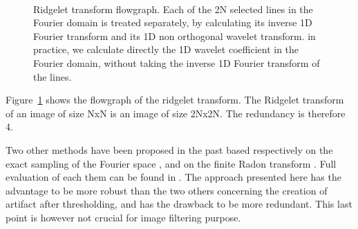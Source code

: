 \documentclass{article}
\begin{document}
\begin{figure}[htb]
\centerline{
\hbox{
}}
\caption{Ridgelet transform flowgraph. Each of the 2N selected lines 
in the Fourier domain is treated separately, by calculating its
inverse 1D Fourier transform and its 1D non orthogonal wavelet transform.
in practice, we calculate directly the 1D wavelet coefficient 
in the Fourier domain, without taking the inverse 1D Fourier transform
of the lines.}
\label{fig_ridgelet}
\end{figure}

Figure~\ref{fig_ridgelet} shows the flowgraph of the ridgelet transform.
The Ridgelet transform of an image of size NxN is an image of size 2Nx2N.
The redundancy is therefore 4.



Two other methods have been proposed in the 
past \cite{cur:candes98,cur:do00} based respectively on the exact sampling
of the Fourier space \cite{cur:candes98}, 
and on the finite Radon transform \cite{cur:matus93}. Full evaluation of each 
them can be found in \cite{cur:donoho00}.
The approach presented here has the advantage to be more robust than the
two others concerning the creation of artifact after thresholding, and 
has the drawback to be more redundant. This last point is however not
crucial for image filtering purpose.
\end{document}
